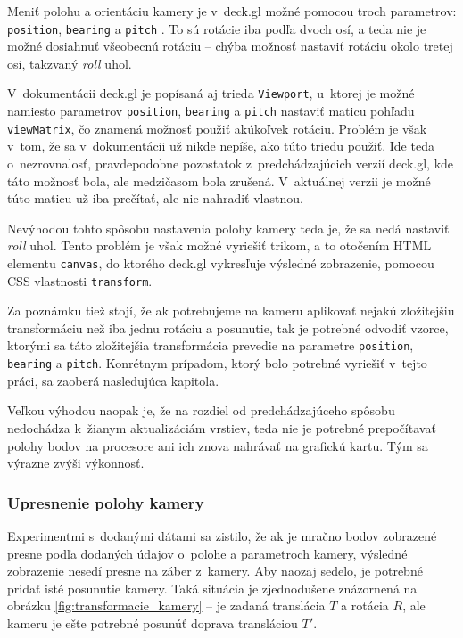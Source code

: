 Meniť polohu a orientáciu kamery je v~deck.gl možné pomocou troch parametrov: \texttt{position}, \texttt{bearing} a \texttt{pitch} \cite{deck.gl_documentation}. To sú rotácie iba podľa dvoch osí, a teda nie je možné dosiahnuť všeobecnú rotáciu -- chýba možnosť nastaviť rotáciu okolo tretej osi, takzvaný \emph{roll} uhol.

V~dokumentácii deck.gl je popísaná aj trieda \texttt{Viewport}, u~ktorej je možné namiesto parametrov \texttt{position}, \texttt{bearing} a \texttt{pitch} nastaviť maticu pohľadu \texttt{viewMatrix}, čo znamená možnosť použiť akúkoľvek rotáciu. Problém je však v~tom, že sa v~dokumentácii už nikde nepíše, ako túto triedu použiť. Ide teda o~nezrovnalosť, pravdepodobne pozostatok z~predchádzajúcich verzií deck.gl, kde táto možnosť bola, ale medzičasom bola zrušená. V~aktuálnej verzii je možné túto maticu už iba prečítať, ale nie nahradiť vlastnou.

Nevýhodou tohto spôsobu nastavenia polohy kamery teda je, že sa nedá nastaviť \emph{roll} uhol. Tento problém je však možné vyriešiť trikom, a to otočením HTML elementu \texttt{canvas}, do ktorého deck.gl vykresľuje výsledné zobrazenie, pomocou CSS vlastnosti \texttt{transform}. 

Za poznámku tiež stojí, že ak potrebujeme na kameru aplikovať nejakú zložitejšiu transformáciu než iba jednu rotáciu a posunutie, tak je potrebné odvodiť vzorce, ktorými sa táto zložitejšia transformácia prevedie na parametre \texttt{position}, \texttt{bearing} a \texttt{pitch}. Konrétnym prípadom, ktorý bolo potrebné vyriešiť v~tejto práci, sa zaoberá nasledujúca kapitola.

Veľkou výhodou naopak je, že na rozdiel od predchádzajúceho spôsobu nedochádza k~žianym aktualizáciám vrstiev, teda nie je potrebné prepočítavať polohy bodov na procesore ani ich znova nahrávať na grafickú kartu. Tým sa výrazne zvýši výkonnosť.

\subsubsection{Upresnenie polohy kamery}

Experimentmi s~dodanými dátami sa zistilo, že ak je mračno bodov zobrazené presne podľa dodaných údajov o~polohe a parametroch kamery, výsledné zobrazenie nesedí presne na záber z~kamery. Aby naozaj sedelo, je potrebné pridať isté posunutie kamery. Taká situácia je zjednodušene znázornená na obrázku \ref{fig:transformacie_kamery} -- je zadaná translácia $T$ a rotácia $R$, ale kameru je ešte potrebné posunúť doprava transláciou $T'$.

